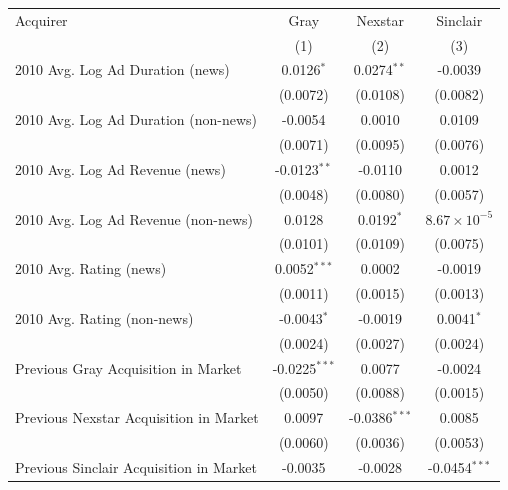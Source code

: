 
\begingroup
\centering
\begin{tabular}{lccc}
   \toprule
   Acquirer                                & Gray            & Nexstar         & Sinclair\\  
                                           & (1)             & (2)             & (3)\\  
   \midrule 
   2010 Avg. Log Ad Duration (news)        & 0.0126$^{*}$    & 0.0274$^{**}$   & -0.0039\\   
                                           & (0.0072)        & (0.0108)        & (0.0082)\\   
   2010 Avg. Log Ad Duration (non-news)    & -0.0054         & 0.0010          & 0.0109\\   
                                           & (0.0071)        & (0.0095)        & (0.0076)\\   
   2010 Avg. Log Ad Revenue (news)         & -0.0123$^{**}$  & -0.0110         & 0.0012\\   
                                           & (0.0048)        & (0.0080)        & (0.0057)\\   
   2010 Avg. Log Ad Revenue (non-news)     & 0.0128          & 0.0192$^{*}$    & $8.67\times 10^{-5}$\\    
                                           & (0.0101)        & (0.0109)        & (0.0075)\\   
   2010 Avg. Rating (news)                 & 0.0052$^{***}$  & 0.0002          & -0.0019\\   
                                           & (0.0011)        & (0.0015)        & (0.0013)\\   
   2010 Avg. Rating (non-news)             & -0.0043$^{*}$   & -0.0019         & 0.0041$^{*}$\\   
                                           & (0.0024)        & (0.0027)        & (0.0024)\\   
   Previous Gray Acquisition in Market     & -0.0225$^{***}$ & 0.0077          & -0.0024\\   
                                           & (0.0050)        & (0.0088)        & (0.0015)\\   
   Previous Nexstar Acquisition in Market  & 0.0097          & -0.0386$^{***}$ & 0.0085\\   
                                           & (0.0060)        & (0.0036)        & (0.0053)\\   
   Previous Sinclair Acquisition in Market & -0.0035         & -0.0028         & -0.0454$^{***}$\\   

\end{tabular}
